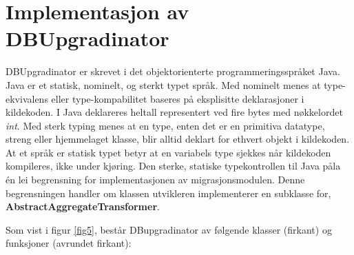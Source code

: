 \section{Implementasjon av DBUpgradinator}

DBUpgradinator er skrevet i det objektorienterte programmeringsspråket Java. Java er et statisk, nominelt, og sterkt typet språk. Med nominelt menes at type-ekvivalens eller type-kompabilitet baseres på eksplisitte deklarasjoner i kildekoden. I Java deklareres heltall representert ved fire bytes med nøkkelordet \emph{int}. Med sterk typing menes at en type, enten det er en primitiva datatype, streng eller hjemmelaget klasse, blir alltid deklart for ethvert objekt i kildekoden. At et språk er statisk typet betyr at en variabels type sjekkes når kildekoden kompileres, ikke under kjøring. Den sterke, statiske typekontrollen til Java påla én lei begrensning for implementasjonen av migrasjonsmodulen. Denne begrensningen handler om klassen utvikleren implementerer en subklasse for, \textbf{AbstractAggregateTransformer}. %

Som vist i figur \ref{fig5}, består DBupgradinator av følgende klasser (firkant) og funksjoner (avrundet firkant):

